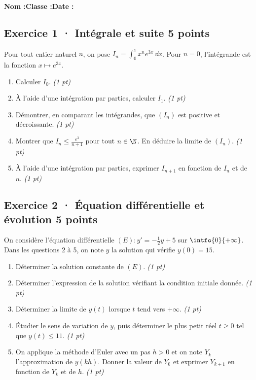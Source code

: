 \smallskip\textbf{Nom :}\enspace\dotfill\quad\textbf{Classe :}\enspace\dotfill\quad\textbf{Date :}\enspace\dotfill

\subsection*{Exercice 1 · Intégrale et suite \hfill 5 points}Pour tout entier naturel $n$, on pose $I_n=\displaystyle\int_0^1x^ne^{3x}\,\dd x$. Pour $n=0$, l'intégrande est la fonction $x\mapsto e^{3x}$.

\begin{enumerate}

\item Calculer $I_0$. \hfill\textit{(1 pt)}

\item À l'aide d'une intégration par parties, calculer $I_1$. \hfill\textit{(1 pt)}

\item Démontrer, en comparant les intégrandes, que $(I_n)$ est positive et décroissante. \hfill\textit{(1 pt)}

\item Montrer que $I_n\le\frac{e^{3}}{n+1}$ pour tout $n\in\N$. En déduire la limite de $(I_n)$. \hfill\textit{(1 pt)}

\item À l'aide d'une intégration par parties, exprimer $I_{n+1}$ en fonction de $I_n$ et de $n$. \hfill\textit{(1 pt)}

\end{enumerate}

\subsection*{Exercice 2 · Équation différentielle et évolution \hfill 5 points}On considère l'équation différentielle $(E):y'=-\frac1{2}y+5$ sur $\intfo{0}{+\infty}$. Dans les questions 2 à 5, on note $y$ la solution qui vérifie $y(0)=15$.

\begin{enumerate}

\item Déterminer la solution constante de $(E)$. \hfill\textit{(1 pt)}

\item Déterminer l'expression de la solution vérifiant la condition initiale donnée. \hfill\textit{(1 pt)}

\item Déterminer la limite de $y(t)$ lorsque $t$ tend vers $+\infty$. \hfill\textit{(1 pt)}

\item Étudier le sens de variation de $y$, puis déterminer le plus petit réel $t\ge0$ tel que $y(t)\le11$. \hfill\textit{(1 pt)}

\item On applique la méthode d'Euler avec un pas $h>0$ et on note $Y_k$ l'approximation de $y(kh)$. Donner la valeur de $Y_0$ et exprimer $Y_{k+1}$ en fonction de $Y_k$ et de $h$. \hfill\textit{(1 pt)}

\end{enumerate}

